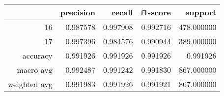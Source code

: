 \begin{table}[h]
\centering
\label{table:5}
\begin{tabular}{rrrrr}
\toprule
 & precision & recall & f1-score & support \\
\midrule
16 & 0.987578 & 0.997908 & 0.992716 & 478.000000 \\
17 & 0.997396 & 0.984576 & 0.990944 & 389.000000 \\
accuracy & 0.991926 & 0.991926 & 0.991926 & 0.991926 \\
macro avg & 0.992487 & 0.991242 & 0.991830 & 867.000000 \\
weighted avg & 0.991983 & 0.991926 & 0.991921 & 867.000000 \\
\bottomrule
\end{tabular}
\end{table}
